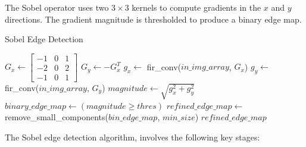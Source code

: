 \documentclass[12pt,a4paper]{article}
\begin{document}
The Sobel operator uses two $3\times3$ kernels to compute gradients in the $x$ and $y$ directions. The gradient magnitude is thresholded to produce a binary edge map.

\begin{algorithm}[H]
    \caption{Sobel Edge Detection}
    \begin{algorithmic}[1]
            \State $G_x \gets \begin{bmatrix} -1 & 0 & 1 \\ -2 & 0 & 2 \\ -1 & 0 & 1 \end{bmatrix}$ 
            \State $G_y \gets -G_x^T$ 
            \State $g_x \gets$ fir\_conv($in\_img\_array$, $G_x$)
            \State $g_y \gets$ fir\_conv($in\_img\_array$, $G_y$)
            \State $magnitude \gets \sqrt{g_x^2 + g_y^2}$ 
            \State $binary\_edge\_map \gets (magnitude \geq thres)$ 
            \State $refined\_edge\_map \gets $remove\_small\_components($bin\_edge\_map$, $min\_size$)
            \State \Return $refined\_edge\_map$
        \EndFunction
    \end{algorithmic}
\end{algorithm}

The Sobel edge detection algorithm, involves the following key stages:
\end{document}
